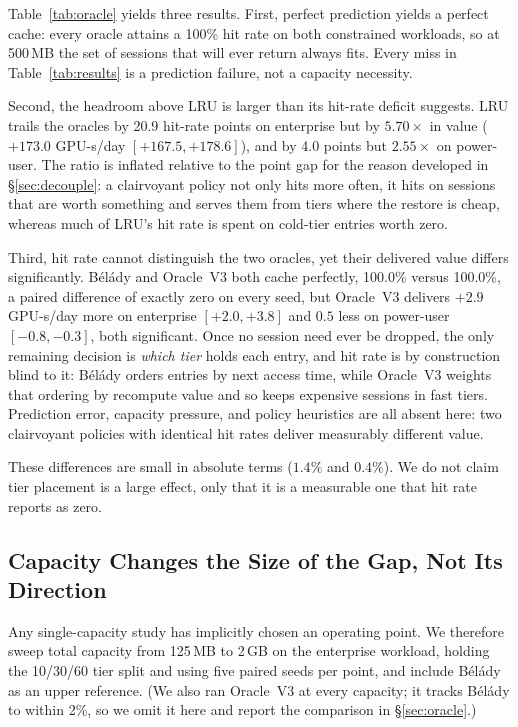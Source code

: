 \documentclass[letterpaper,twocolumn,10pt]{article}
\begin{document}
Table~\ref{tab:oracle} yields three results. First, perfect prediction yields a perfect cache: every oracle attains a 100\% hit rate on both constrained workloads, so at 500\,MB the set of sessions that will ever return always fits. Every miss in Table~\ref{tab:results} is a prediction failure, not a capacity necessity.

Second, the headroom above LRU is larger than its hit-rate deficit suggests. LRU trails the oracles by 20.9 hit-rate points on enterprise but by $5.70\times$ in value ($+173.0$ GPU-s/day $[+167.5, +178.6]$), and by 4.0 points but $2.55\times$ on power-user. The ratio is inflated relative to the point gap for the reason developed in \S\ref{sec:decouple}: a clairvoyant policy not only hits more often, it hits on sessions that are worth something and serves them from tiers where the restore is cheap, whereas much of LRU's hit rate is spent on cold-tier entries worth zero.

Third, hit rate cannot distinguish the two oracles, yet their delivered value differs significantly. B\'{e}l\'{a}dy and Oracle~V3 both cache perfectly, 100.0\% versus 100.0\%, a paired difference of exactly zero on every seed, but Oracle~V3 delivers $+2.9$ GPU-s/day more on enterprise $[+2.0, +3.8]$ and $0.5$ less on power-user $[-0.8, -0.3]$, both significant. Once no session need ever be dropped, the only remaining decision is \emph{which tier} holds each entry, and hit rate is by construction blind to it: B\'{e}l\'{a}dy orders entries by next access time, while Oracle~V3 weights that ordering by recompute value and so keeps expensive sessions in fast tiers. Prediction error, capacity pressure, and policy heuristics are all absent here: two clairvoyant policies with identical hit rates deliver measurably different value.

These differences are small in absolute terms ($1.4\%$ and $0.4\%$). We do not claim tier placement is a large effect, only that it is a measurable one that hit rate reports as zero.

\subsection{Capacity Changes the Size of the Gap, Not Its Direction}
\label{sec:regimes}

Any single-capacity study has implicitly chosen an operating point. We therefore sweep total capacity from 125\,MB to 2\,GB on the enterprise workload, holding the 10/30/60 tier split and using five paired seeds per point, and include B\'{e}l\'{a}dy as an upper reference. (We also ran Oracle~V3 at every capacity; it tracks B\'{e}l\'{a}dy to within 2\%, so we omit it here and report the comparison in \S\ref{sec:oracle}.)
\end{document}
